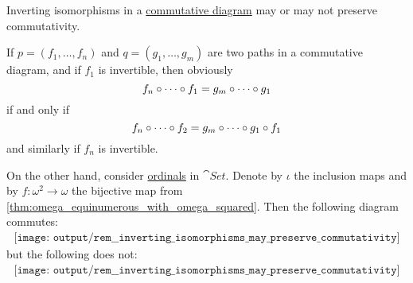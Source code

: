 \begin{remark}\label{rem:inverting_isomorphisms_may_preserve_commutativity}
  Inverting isomorphisms in a \hyperref[def:categorical_diagram]{commutative diagram} may or may not preserve commutativity.

  If \( p = (f_1, \ldots, f_n) \) and \( q = (g_1, \ldots, g_m) \) are two paths in a commutative diagram, and if \( f_1 \) is invertible, then obviously
  \begin{equation*}
    f_n \bincirc \cdots \bincirc f_1 = g_m \bincirc \cdots \bincirc g_1
  \end{equation*}
  if and only if
  \begin{equation*}
    f_n \bincirc \cdots \bincirc f_2 = g_m \bincirc \cdots \bincirc g_1 \bincirc f_1
  \end{equation*}
  and similarly if \( f_n \) is invertible.

  On the other hand, consider \hyperref[def:ordinal]{ordinals} in \( \cat{Set} \). Denote by \( \iota \) the inclusion maps and by \( f: \omega^2 \to \omega \) the bijective map from \cref{thm:omega_equinumerous_with_omega_squared}. Then the following diagram commutes:
  \begin{equation}\label{eq:rem:inverting_isomorphisms_may_preserve_commutativity/ordinals_commuting}
    \begin{aligned}
      \texttt{[image: output/rem\_\_inverting\_isomorphisms\_may\_preserve\_commutativity]}
    \end{aligned}
  \end{equation}
  but the following does not:
  \begin{equation}\label{eq:rem:inverting_isomorphisms_may_preserve_commutativity/ordinals_not_commuting}
    \begin{aligned}
      \texttt{[image: output/rem\_\_inverting\_isomorphisms\_may\_preserve\_commutativity]}
    \end{aligned}
  \end{equation}
\end{remark}


